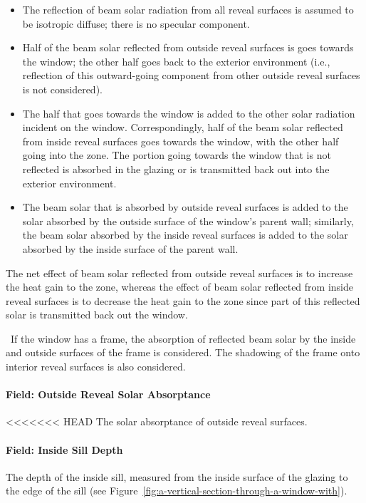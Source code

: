 \begin{itemize}
\item
  The reflection of beam solar radiation from all reveal surfaces is assumed to be isotropic diffuse; there is no specular component.
\item
  Half of the beam solar reflected from outside reveal surfaces is goes towards the window; the other half goes back to the exterior environment (i.e., reflection of this outward-going component from other outside reveal surfaces is not considered).
\item
  The half that goes towards the window is added to the other solar radiation incident on the window. Correspondingly, half of the beam solar reflected from inside reveal surfaces goes towards the window, with the other half going into the zone. The portion going towards the window that is not reflected is absorbed in the glazing or is transmitted back out into the exterior environment.
\item
  The beam solar that is absorbed by outside reveal surfaces is added to the solar absorbed by the outside surface of the window's parent wall; similarly, the beam solar absorbed by the inside reveal surfaces is added to the solar absorbed by the inside surface of the parent wall.
\end{itemize}

The net effect of beam solar reflected from outside reveal surfaces is to increase the heat gain to the zone, whereas the effect of beam solar reflected from inside reveal surfaces is to decrease the heat gain to the zone since part of this reflected solar is transmitted back out the window.

~If the window has a frame, the absorption of reflected beam solar by the inside and outside surfaces of the frame is considered. The shadowing of the frame onto interior reveal surfaces is also considered.

\paragraph{Field: Outside Reveal Solar Absorptance}\label{field-outside-reveal-solar-absorptance}

<<<<<<< HEAD
The solar absorptance of outside reveal surfaces.

\paragraph{Field: Inside Sill Depth}\label{field-inside-sill-depth}

The depth of the inside sill, measured from the inside surface of the glazing to the edge of the sill (see Figure~\ref{fig:a-vertical-section-through-a-window-with}).

